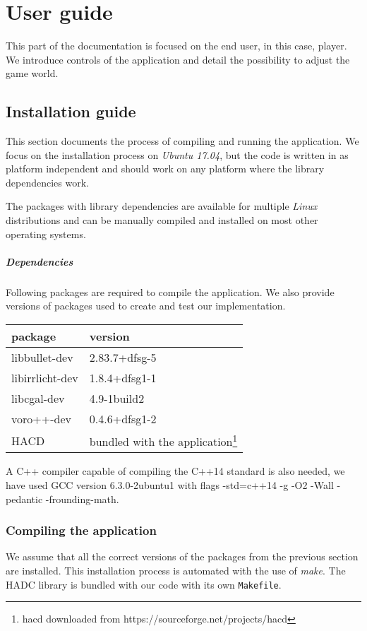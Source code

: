 \chapter{User guide}
This part of the documentation is focused on the end user, in this case, player. We introduce controls of the application and detail the possibility to adjust the game world.

\section{Installation guide}

This section documents the process of compiling and running the application. We focus on the installation process on \emph{Ubuntu 17.04}, but the code is written in as platform independent and should work on any platform where the library dependencies work.

The packages with library dependencies are available for multiple \emph{Linux}
distributions and can be manually compiled and installed on most other
operating systems.

\paragraph{Dependencies}
Following packages are required to compile the application. We also provide versions of packages used to create and test our implementation.
\begin{center}
\begin{tabular}{ll}
package & version \\
\hline
libbullet-dev & 2.83.7+dfsg-5 \\
libirrlicht-dev & 1.8.4+dfsg1-1 \\
libcgal-dev & 4.9-1build2 \\
voro++-dev & 0.4.6+dfsg1-2 \\
HACD & bundled with the application\footnote{hacd downloaded from https://sourceforge.net/projects/hacd}
\end{tabular}
\end{center}

A C++ compiler capable of compiling the C++14 standard is also needed, we have used GCC version 6.3.0-2ubuntu1 with flags -std=c++14 -g -O2 -Wall -pedantic -frounding-math.

\subsection*{Compiling the application}
We assume that all the correct versions of the packages from the previous section are installed. This installation process is automated with the use of \emph{make}. The HADC library is bundled with our code with its own {\tt Makefile}.

